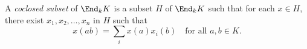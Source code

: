 A \emph{coclosed subset} of $\End_k K$ is a subset $H$ of $\End_k K$ such that for each $x \in H$, there exist $x_1, x_2, \ldots, x_n$ in $H$ such that
$$x(ab) = \sum_i x(a)x_i(b) \quad \text{for all } a, b \in K.$$
